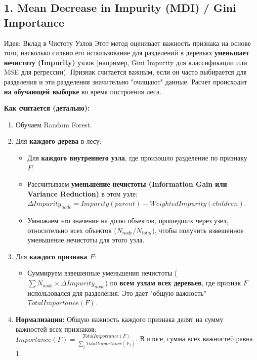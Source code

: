 \subsection{1. Mean Decrease in Impurity (MDI) / Gini Importance}

\begin{myblock}{Идея: Вклад в Чистоту Узлов}
    Этот метод оценивает важность признака на основе того, насколько сильно его использование для разделений в деревьях \textbf{уменьшает нечистоту (Impurity)} узлов (например, Gini Impurity для классификации или MSE для регрессии). Признак считается важным, если он часто выбирается для разделения и эти разделения значительно "очищают" данные. Расчет происходит \textbf{на обучающей выборке} во время построения леса.

    \textbf{Как считается (детально):}
    \begin{enumerate}
        \item Обучаем Random Forest.
        \item Для \textbf{каждого дерева} в лесу:
            \begin{itemize}
                \item Для \textbf{каждого внутреннего узла}, где произошло разделение по признаку $F$:
                \item Рассчитываем \textbf{уменьшение нечистоты (Information Gain или Variance Reduction)} в этом узле: \\ $\Delta Impurity_{node} = Impurity(parent) - WeightedImpurity(children)$.
                \item Умножаем это значение на долю объектов, прошедших через узел, относительно всех объектов ($N_{node} / N_{total}$), чтобы получить взвешенное уменьшение нечистоты для этого узла.
            \end{itemize}
        \item Для \textbf{каждого признака $F$}:
            \begin{itemize}
                \item Суммируем взвешенные уменьшения нечистоты ($\sum N_{node} \times \Delta Impurity_{node}$) по \textbf{всем узлам всех деревьев}, где признак $F$ использовался для разделения. Это дает "общую важность" $TotalImportance(F)$.
            \end{itemize}
        \item \textbf{Нормализация:} Общую важность каждого признака делят на сумму важностей всех признаков: \\ $Importance(F) = \frac{TotalImportance(F)}{\sum_{j} TotalImportance(F_j)}$. В итоге, сумма всех важностей равна 1.
    \end{enumerate}


\end{myblock}
